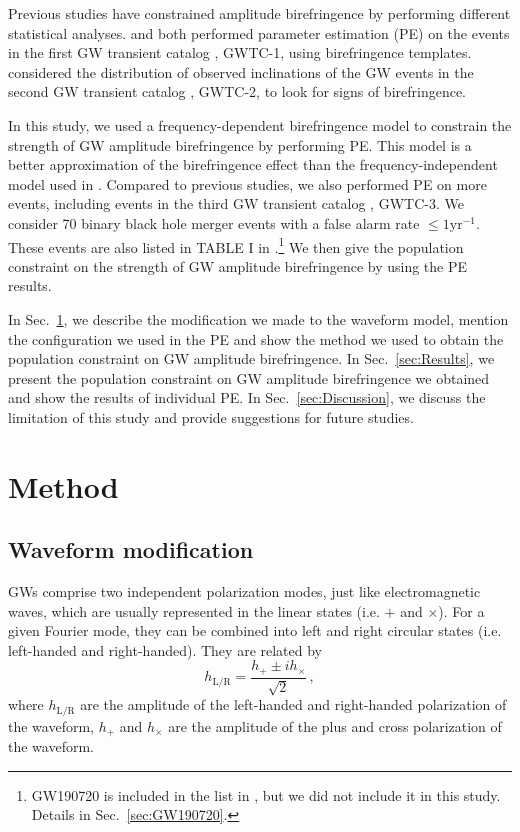 \documentclass[aps,prd,twocolumn,superscriptaddress,preprintnumbers,floatfix,nofootinbib]{revtex4-2}
\begin{document}
Previous studies have constrained amplitude birefringence by performing different statistical analyses.
\citet{Yamada_2020} and \citet{Wang_2021} both performed parameter estimation (PE) on the events in the first GW transient catalog \citep{GWTC-1}, GWTC-1, using birefringence templates.
\citet{Okounkova_2022} considered the distribution of observed inclinations of the GW events in the second GW transient catalog \citep{GWTC-2}, GWTC-2, to look for signs of birefringence.

In this study, we used a frequency-dependent birefringence model to constrain the strength of GW amplitude birefringence by performing PE.
This model is a better approximation of the birefringence effect than the frequency-independent model used in \citet{Okounkova_2022}.
Compared to previous studies, we also performed PE on more events, including events in the third GW transient catalog \citep{GWTC-3}, GWTC-3.
We consider 70 binary black hole merger events with a false alarm rate $\leq1\mathrm{yr^{-1}}$.
These events are also listed in TABLE I in \citet{GWTC-3_population}.\footnote{
GW190720 is included in the list in \citet{GWTC-3_population}, but we did not include it in this study.
Details in Sec.~\ref{sec:GW190720}.}
We then give the population constraint on the strength of GW amplitude birefringence by using the PE results.

In Sec.~\ref{sec:Method}, we describe the modification we made to the waveform model, mention the configuration we used in the PE and show the method we used to obtain the population constraint on GW amplitude birefringence.
In Sec.~\ref{sec:Results}, we present the population constraint on GW amplitude birefringence we obtained and show the results of individual PE.
In Sec.~\ref{sec:Discussion}, we discuss the limitation of this study and provide suggestions for future studies.

\section{Method}
\label{sec:Method}

\subsection{Waveform modification}
GWs comprise two independent polarization modes, just like electromagnetic waves, which are usually represented in the linear states (i.e. $+$ and $\times$).
For a given Fourier mode, they can be combined into left and right circular states (i.e. left-handed and right-handed).
They are related by
\begin{equation}
    h_{\mathrm{L/R}} = \frac{h_+ \pm i h_\times}{\sqrt{2}}\,,
\end{equation}
where $h_{\mathrm{L/R}}$ are the amplitude of the left-handed and right-handed polarization of the waveform, $h_+$ and $h_\times$ are the amplitude of the plus and cross polarization of the waveform.
\end{document}
